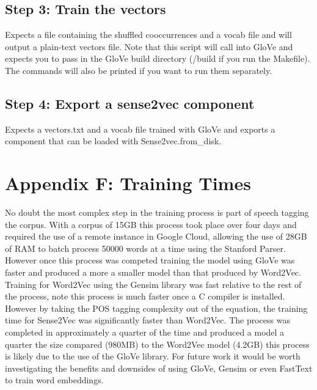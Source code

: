 \subsection*{Step 3: Train the vectors}
Expects a file containing the shuffled cooccurrences and a vocab file and will output a plain-text vectors file. Note that this script will call into GloVe and expects you to pass in the GloVe build directory (/build if you run the Makefile). The commands will also be printed if you want to run them separately.

\subsection*{Step 4: Export a sense2vec component}
Expects a vectors.txt and a vocab file trained with GloVe and exports a component that can be loaded with Sense2vec.from\_disk.

\section*{Appendix F: Training Times}
No doubt the most complex step in the training process is part of speech tagging the corpus. With a corpus of 15GB this process took place over four days and required the use of a remote instance in Google Cloud, allowing the use of 28GB of RAM to batch process 50000 words at a time using the Stanford Parser. However once this process was competed training the model using GloVe was faster and produced a more a smaller model than that produced by Word2Vec. Training for Word2Vec using the Gensim library was fast relative to the rest of the process, note this process is much faster once a C compiler is installed. However by taking the POS tagging complexity out of the equation, the training time for Sense2Vec was significantly faster than Word2Vec. The process was completed in approximately a quarter of the time and produced a model a quarter the size compared (980MB) to the Word2Vec model (4.2GB) this process is likely due to the use of the GloVe library. For future work it would be worth investigating the benefits and downsides of using GloVe, Gensim or even FastText to train word embeddings.